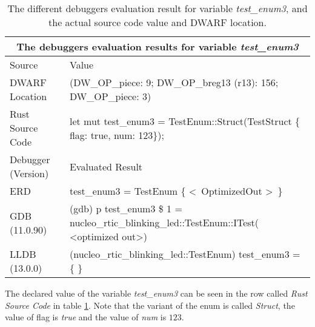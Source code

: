 \begin{table}[h]
	\centering
	\small
	\begin{tabular}{ |p{2cm}|p{8cm}|  }
		\hline
		\multicolumn{2}{|c|}{\textbf{The debuggers evaluation results for variable \emph{test\_enum3}}} \\ 
		\hline
		\hline
		Source & Value \\
		\hline

		DWARF Location & (DW\_OP\_piece: 9; DW\_OP\_breg13 (r13): 156; DW\_OP\_piece: 3) \\

		Rust Source Code & let mut test\_enum3 = TestEnum::Struct(TestStruct \{ flag: true, num: 123\}); \\
		\hline
		\hline
		Debugger (Version) & Evaluated Result \\
		\hline
		ERD & test\_enum3 = 
		TestEnum \{ \textless \ OptimizedOut \textgreater \ \}\\

		GDB (11.0.90)  & (gdb) p test\_enum3\newline
		\$ 1 = nucleo\_rtic\_blinking\_led::TestEnum::ITest(\newline
		\textless optimized out\textgreater) \\

		LLDB (13.0.0) & (nucleo\_rtic\_blinking\_led::TestEnum) test\_enum3 = \{\newline
		\text{\ \ ITest = (0 = 0)}\newline
		\text{\ \ UTest = (0 = 0)}\newline
		\text{\ \ Struct = \{}\newline
		\text{\ \ \ \ 0 = (flag = false, num = 0)}\newline
		\text{\ \ \}}\newline
		\text{\ \ Non = \{\}}\newline
		\} \\
		\hline
	\end{tabular}
	\caption{The different debuggers evaluation result for variable \emph{test\_enum3}, and the actual source code value and DWARF location.}
	\label{table:enum3}
\end{table}


The declared value of the variable \emph{test\_enum3} can be seen in the row called \emph{Rust Source Code} in table \ref{table:enum3}.
Note that the variant of the enum is called \emph{Struct}, the value of flag is \emph{true} and the value of \emph{num} is $123$.


